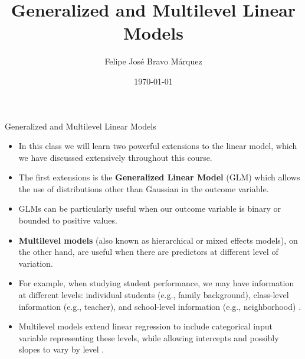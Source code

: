 \documentclass[handout]{beamer}
\title{Generalized and Multilevel Linear Models}
\author[Felipe Bravo Márquez]{\footnotesize
 \textcolor[rgb]{0.00,0.00,1.00}{Felipe José Bravo Márquez}}
\date{ \today }
\begin{document}
\begin{frame}
\titlepage


\end{frame}




\begin{frame}{Generalized and Multilevel Linear Models}
\scriptsize{
\begin{itemize}
\item In this class we will learn two powerful extensions to the linear model, which we have discussed extensively throughout this course.

\item The first extensions is the \textbf{Generalized Linear Model} (GLM) which allows the use of distributions other than Gaussian in the outcome variable.

\item GLMs can be particularly useful when our outcome variable  is binary or bounded to positive values.

\item \textbf{Multilevel models} (also known as hierarchical or mixed effects models), on the other hand, are useful when there are predictors at different level of variation.

\item For example, when studying student performance, we may have information at different levels:  individual students  (e.g., family background), class-level information (e.g., teacher), and school-level information (e.g., neighborhood) \cite{gelman2013bayesian}.


\item Multilevel models extend linear regression to include categorical input variable representing these levels, while allowing intercepts and possibly slopes to vary by level \cite{gelman2006data}.



\end{itemize}



}

\end{frame}
\end{document}
